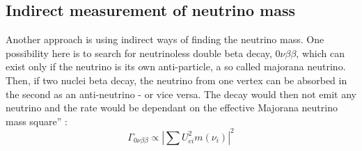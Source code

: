     \subsection{Indirect measurement of neutrino mass}
    \label{ch:Introduction:sec:Massive neutrino:subsec:indirect Neutrino Mass measurement}
    Another approach is using indirect ways of finding the neutrino mass. One possibility here is to search for neutrinoless double beta decay, $0\nu\beta\beta$, which can exist only if the neutrino is its own anti-particle, a so called majorana neutrino. Then, if two nuclei beta decay, the neutrino from one vertex can be absorbed in the second as an anti-neutrino - or vice versa. The decay would then not emit any neutrino and the rate would be dependant on the effective Majorana neutrino mass square'' \cite{currentNeutrinoSearches}:
    \begin{equation}
    	\Gamma_{0\nu\beta\beta} \propto \left| \sum{U_{ei}^2m\left(\nu_i\right)}\right|^2
    \end{equation}

    
